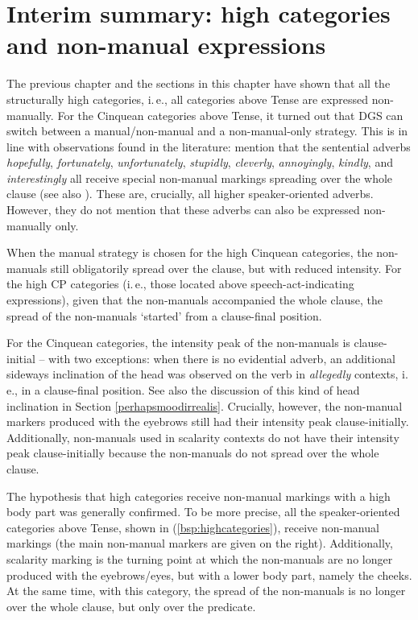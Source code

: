 \section{Interim summary: high categories and non-manual expressions}

The previous chapter and the sections in this chapter have shown that all the structurally high categories, i.\,e., all categories above Tense are expressed non-manually. For the Cinquean categories above Tense, it turned out that DGS can switch between a manual/non-manual and a non-manual-only strategy. This is in line with observations found in the literature: \citet[365--366]{happ2014vork} mention that the sentential adverbs \textit{hopefully}, \textit{fortunately}, \textit{unfortunately}, \textit{stupidly}, \textit{cleverly}, \textit{annoyingly}, \textit{kindly}, and \textit{interestingly} all receive special non-manual markings spreading over the whole clause (see also \citealt{herrmann2014nonmanual}). These are, crucially, all higher speaker-oriented adverbs. However, they do not mention that these adverbs can also be expressed non-manually only.

When the manual strategy is chosen for the high Cinquean categories, the non-manuals still obligatorily spread over the clause, but with reduced intensity. For the high CP categories (i.\,e., those located above speech-act-indicating expressions), given that the non-manuals accompanied the whole clause, the spread of the non-manuals `started' from a clause-final position.

For the Cinquean categories, the intensity peak of the non-manuals is clause-initial -- with two exceptions: when there is no evidential adverb, an additional sideways inclination of the head was observed on the verb in \textit{allegedly} contexts, i.\,e., in a clause-final position. See also the discussion of this kind of head inclination in Section \ref{perhapsmoodirrealis}. Crucially, however, the non-manual markers produced with the eyebrows still had their intensity peak clause-initially. Additionally, non-manuals used in scalarity contexts do not have their intensity peak clause-initially because the non-manuals do not spread over the whole clause.

The hypothesis that high categories receive non-manual markings with a high body part was generally confirmed. To be more precise, all the speaker-oriented categories above Tense, shown in (\ref{bsp:highcategories}), receive non-manual markings (the main non-manual markers are given on the right). Additionally, scalarity marking is the turning point at which the non-manuals are no longer produced with the eyebrows/eyes, but with a lower body part, namely the cheeks. At the same time, with this category, the spread of the non-manuals is no longer over the whole clause, but only over the predicate.

